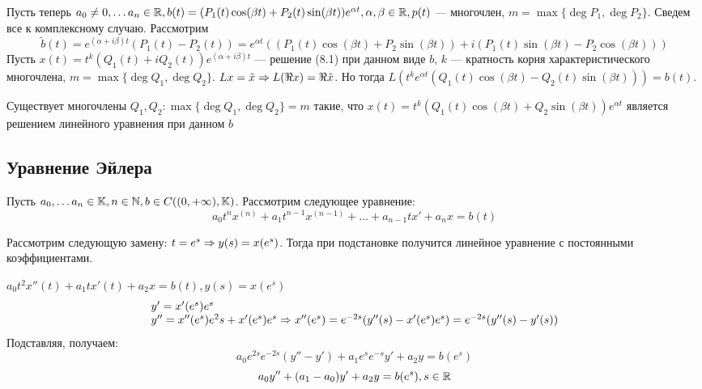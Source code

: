 Пусть теперь \(a_0 \ne 0, \dots a_n \in \mathbb{R}, b(t) = (P_1(t)\cos(\beta t) + P_2(t)\sin(\beta t))e^{\alpha t} , \alpha, \beta \in \mathbb{R}, p(t)\) --- многочлен, \(m = \max\{\deg P_1, \deg P_2\}\).
Сведем все к комплексному случаю. Рассмотрим
\[\tilde{b}(t) = e^{(\alpha + i\beta)t}(P_1(t) - P_2(t)) = e^{\alpha t}((P_1(t)\cos (\beta t) + P_2 \sin (\beta t)) + i(P_1(t)\sin (\beta t) - P_2 \cos (\beta t)))\]
Пусть \(x(t) = t^k(Q_1(t) + iQ_2(t))e^{(\alpha + i\beta)t}\) --- решение (8.1) при данном виде \(b\), \(k\) --- кратность корня характеристического многочлена, \(m = \max\{\deg Q_1, \deg Q_2\}\). \(Lx = \tilde{x} \Rightarrow L(\Re x) = \Re \tilde{x}\). Но тогда \(L(t^ke^{\alpha t}(Q_1(t)\cos(\beta t) - Q_2(t)\sin(\beta t))) = b(t)\).

\begin{corollary}
    Существует многочлены \(Q_1, Q_2: \max\{\deg Q_1, \deg Q_2\} = m\) такие, что \(x(t) = t^k(Q_1(t)\cos(\beta t) + Q_2\sin(\beta t))e^{\alpha t}\) является решением линейного уравнения при данном \(b\)
\end{corollary}

\subsection{Уравнение Эйлера}
Пусть \(a_0, \dots a_n \in \mathbb{K}, n \in \mathbb{N}, b \in C((0, +\infty), \mathbb{K})\). Рассмотрим следующее уравнение:
\[a_0t^nx^{(n)} + a_1t^{n - 1}x^{(n - 1)} + \dots + a_{n - 1}tx' + a_nx = b(t)\]

Рассмотрим следующую замену: \(t = e^s \Rightarrow y(s) = x(e^s)\). Тогда при подстановке получится линейное уравнение с постоянными коэффициентами.


\begin{example}
    \(a_0t^2x''(t) + a_1tx'(t) + a_2x = b(t), y(s) = x(e^s)\)
    \[\begin{array}{l}
        y' = x'(e^s)e^s \\
        y'' = x''(e^s)e^2s + x'(e^s)e^s \Rightarrow x''(e^s) = e^{-2s}(y''(s) - x'(e^s)e^s) = e^{-2s}(y''(s) - y'(s)) \\
    \end{array}\]
    Подставляя, получаем:
    \[a_0e^{2s} e^{-2s}(y'' - y') + a_1e^se^{-s}y' + a_2y = b(e^s)\]
    \[a_0y'' + (a_1 - a_0)y' + a_2y = b(e^s), s \in \mathbb{R}\]
\end{example}
